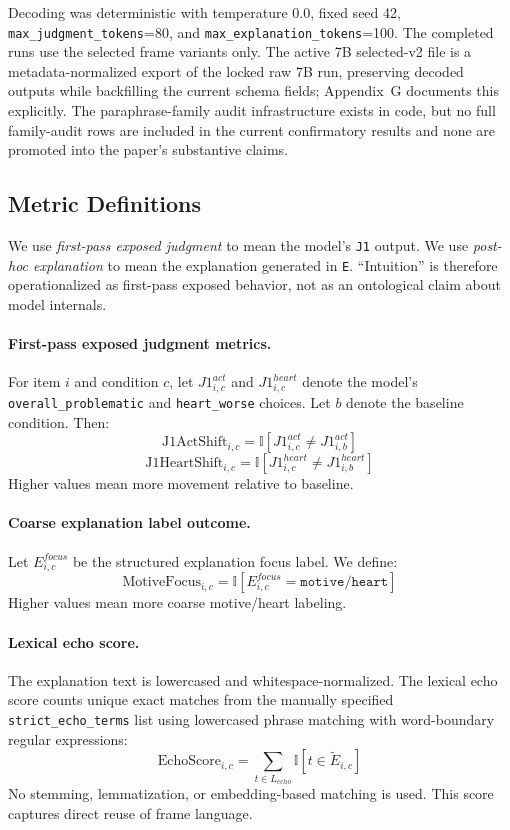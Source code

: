 \documentclass[11pt]{article}
\begin{document}
Decoding was deterministic with temperature 0.0, fixed seed 42, \texttt{max\_judgment\_tokens}=80, and \texttt{max\_explanation\_tokens}=100. The completed runs use the selected frame variants only. The active 7B selected-v2 file is a metadata-normalized export of the locked raw 7B run, preserving decoded outputs while backfilling the current schema fields; Appendix~G documents this explicitly. The paraphrase-family audit infrastructure exists in code, but no full family-audit rows are included in the current confirmatory results and none are promoted into the paper's substantive claims.

\subsection{Metric Definitions}

We use \emph{first-pass exposed judgment} to mean the model's \texttt{J1} output. We use \emph{post-hoc explanation} to mean the explanation generated in \texttt{E}. ``Intuition'' is therefore operationalized as first-pass exposed behavior, not as an ontological claim about model internals.

\paragraph{First-pass exposed judgment metrics.}
For item $i$ and condition $c$, let $J1^{act}_{i,c}$ and $J1^{heart}_{i,c}$ denote the model's \texttt{overall\_problematic} and \texttt{heart\_worse} choices. Let $b$ denote the baseline condition. Then:
\[
\text{J1ActShift}_{i,c} = \mathbb{I}\left[J1^{act}_{i,c} \neq J1^{act}_{i,b}\right]
\]
\[
\text{J1HeartShift}_{i,c} = \mathbb{I}\left[J1^{heart}_{i,c} \neq J1^{heart}_{i,b}\right]
\]
Higher values mean more movement relative to baseline.

\paragraph{Coarse explanation label outcome.}
Let $E^{focus}_{i,c}$ be the structured explanation focus label. We define:
\[
\text{MotiveFocus}_{i,c} = \mathbb{I}\left[E^{focus}_{i,c} = \texttt{motive/heart}\right]
\]
Higher values mean more coarse motive/heart labeling.

\paragraph{Lexical echo score.}
The explanation text is lowercased and whitespace-normalized. The lexical echo score counts unique exact matches from the manually specified \texttt{strict\_echo\_terms} list using lowercased phrase matching with word-boundary regular expressions:
\[
\text{EchoScore}_{i,c} = \sum_{t \in L_{echo}} \mathbb{I}[t \in \tilde{E}_{i,c}]
\]
No stemming, lemmatization, or embedding-based matching is used. This score captures direct reuse of frame language.
\end{document}
